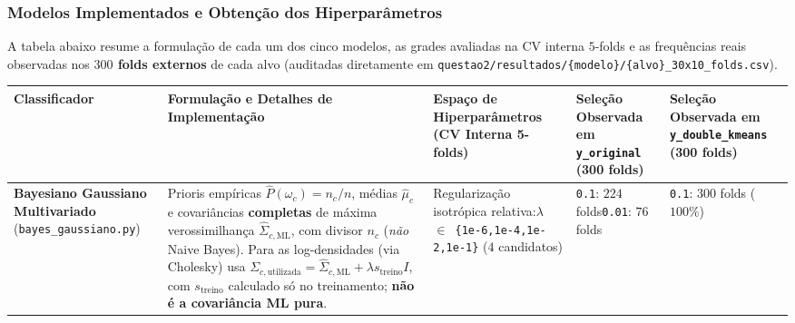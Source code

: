 \documentclass[a4paper,11pt]{article}
\begin{document}
\subsubsection{Modelos Implementados e Obtenção dos Hiperparâmetros}\label{sec:2-3-2-modelos-implementados-e-obtencao-dos-hiperparametros}


A tabela abaixo resume a formulação de cada um dos cinco modelos, as grades avaliadas na CV interna $5$-folds e as frequências reais observadas nos \textbf{$300$ folds externos} de cada alvo (auditadas diretamente em \texttt{questao2/\allowbreak resultados/\allowbreak \{modelo\}/\allowbreak \{alvo\}\_\allowbreak 30x10\_\allowbreak folds.csv}).

\begin{center}
\begin{minipage}{\linewidth}
\centering
{}
\scriptsize
\sloppy
\setlength{\tabcolsep}{2.5pt}
\renewcommand{\arraystretch}{1.18}
\begin{tabularx}{\linewidth}{P{2.25cm} L P{2.85cm} P{2.3cm} P{2.3cm}}
\toprule
\textbf{Classificador} & \textbf{Formulação e Detalhes de Implementação} & \textbf{Espaço de Hiperparâmetros (CV Interna 5-folds)} & \textbf{Seleção Observada em \texttt{y\_\allowbreak original} (300 folds)} & \textbf{Seleção Observada em \texttt{y\_\allowbreak double\_\allowbreak kmeans} (300 folds)} \\
\midrule
\textbf{Bayesiano Gaussiano Multivariado} (\texttt{bayes\_\allowbreak gaussiano.py}) & Prioris empíricas $\hat{P}(\omega_c)=n_c/n$, médias $\hat\mu_c$ e covariâncias \textbf{completas} de máxima verossimilhança $\hat\Sigma_{c,\mathrm{ML}}$, com divisor $n_c$ (\textit{não} Naive Bayes). Para as log-densidades (via Cholesky) usa $\Sigma_{c,\text{utilizada}}=\hat\Sigma_{c,\mathrm{ML}}+\lambda s_{\text{treino}}I$, com $s_{\text{treino}}$ calculado só no treinamento; \textbf{não é a covariância ML pura}. & Regularização isotrópica relativa:\newline \texttt{\ensuremath{\lambda} \ensuremath{\in} \{1e-6,\allowbreak  1e-4,\allowbreak  1e-2,\allowbreak  1e-1\}} ($4$ candidatos) & \texttt{0.1}: $224$ folds\newline \texttt{0.01}: $76$ folds & \texttt{0.1}: $300$ folds ($100\%$) \\

\end{tabularx}
\end{minipage}
\end{center}
\end{document}
